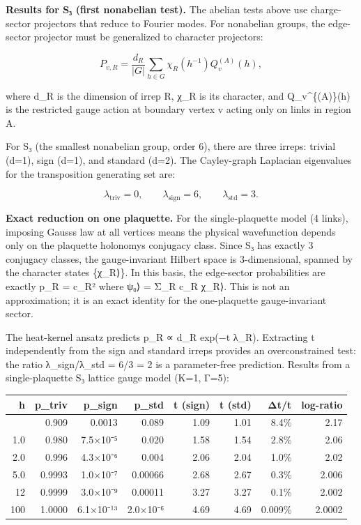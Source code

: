 \textbf{Results for S₃ (first nonabelian test).} The abelian tests above use charge-sector projectors that reduce to Fourier modes. For nonabelian groups, the edge-sector projector must be generalized to character projectors:

\[
P_{v,R} = \frac{d_R}{|G|} \sum_{h \in G} \chi_R(h^{-1}) Q_v^{(A)}(h),
\]

where d\_R is the dimension of irrep R, χ\_R is its character, and Q\_v\^{}\{(A)\}(h) is the restricted gauge action at boundary vertex v acting only on links in region A.

For S₃ (the smallest nonabelian group, order 6), there are three irreps: trivial (d=1), sign (d=1), and standard (d=2). The Cayley-graph Laplacian eigenvalues for the transposition generating set are:

\[
\lambda_{\mathrm{triv}} = 0, \qquad \lambda_{\mathrm{sign}} = 6, \qquad
\lambda_{\mathrm{std}} = 3.
\]

\textbf{Exact reduction on one plaquette.} For the single-plaquette model (4 links), imposing Gauss\textquotesingle s law at all vertices means the physical wavefunction depends only on the plaquette holonomy\textquotesingle s conjugacy class. Since S₃ has exactly 3 conjugacy classes, the gauge-invariant Hilbert space is 3-dimensional, spanned by the character states \{\textbar χ\_R⟩\}. In this basis, the edge-sector probabilities are exactly p\_R = \textbar c\_R\textbar² where \textbar ψ₀⟩ = Σ\_R c\_R \textbar χ\_R⟩. This is not an approximation; it is an exact identity for the one-plaquette gauge-invariant sector.

The heat-kernel ansatz predicts p\_R ∝ d\_R exp(−t λ\_R). Extracting t independently from the sign and standard irreps provides an overconstrained test: the ratio λ\_sign/λ\_std = 6/3 = 2 is a parameter-free prediction. Results from a single-plaquette S₃ lattice gauge model (K=1, Γ=5):

{\def\LTcaptype{none} %
\begin{longtable}[]{@{}rrrrrrrr@{}}
\toprule\noalign{}
h & p\_triv & p\_sign & p\_std & t (sign) & t (std) & Δt/t & log-ratio \\
\midrule\noalign{}
\endhead
\bottomrule\noalign{}
\endlastfoot
0.5 & 0.909 & 0.0013 & 0.089 & 1.09 & 1.01 & 8.4\% & 2.17 \\
1.0 & 0.980 & 7.5×10⁻⁵ & 0.020 & 1.58 & 1.54 & 2.8\% & 2.06 \\
2.0 & 0.996 & 4.3×10⁻⁶ & 0.004 & 2.06 & 2.04 & 1.0\% & 2.02 \\
5.0 & 0.9993 & 1.0×10⁻⁷ & 0.00066 & 2.68 & 2.67 & 0.3\% & 2.006 \\
12 & 0.9999 & 3.0×10⁻⁹ & 0.00011 & 3.27 & 3.27 & 0.1\% & 2.002 \\
100 & 1.0000 & 6.1×10⁻¹³ & 2.0×10⁻⁶ & 4.69 & 4.69 & 0.009\% & 2.0002 \\
\end{longtable}
}

